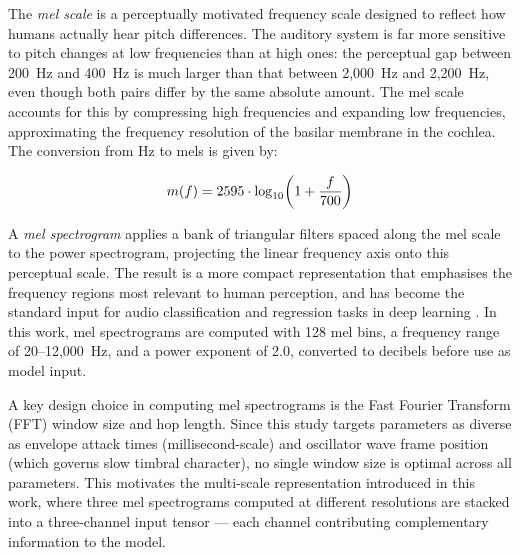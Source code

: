 \par \vspace{0.3cm}

\noindent The \textit{mel scale} is a perceptually motivated frequency scale designed to reflect how humans actually hear pitch differences. The auditory system is far more sensitive to pitch changes at low frequencies than at high ones: the perceptual gap between 200~Hz and 400~Hz is much larger than that between 2{,}000~Hz and 2{,}200~Hz, even though both pairs differ by the same absolute amount. The mel scale accounts for this by compressing high frequencies and expanding low frequencies, approximating the frequency resolution of the basilar membrane in the cochlea. The conversion from Hz to mels is given by:

\begin{equation}
  m(f) = 2595 \cdot \log_{10}\!\left(1 + \frac{f}{700}\right)
  \label{eq:mel_bg}\eqname{Hertz to mel scale conversion}
\end{equation}

\par \vspace{0.3cm}

\noindent A \textit{mel spectrogram} applies a bank of triangular filters spaced along the mel scale to the power spectrogram, projecting the linear frequency axis onto this perceptual scale. The result is a more compact representation that emphasises the frequency regions most relevant to human perception, and has become the standard input for audio classification and regression tasks in deep learning \cite{hershey2017cnn}. In this work, mel spectrograms are computed with 128 mel bins, a frequency range of 20--12{,}000~Hz, and a power exponent of 2.0, converted to decibels before use as model input.

\par \vspace{0.3cm}

\noindent A key design choice in computing mel spectrograms is the Fast Fourier Transform (FFT) window size and hop length. Since this study targets parameters as diverse as envelope attack times (millisecond-scale) and oscillator wave frame position (which governs slow timbral character), no single window size is optimal across all parameters. This motivates the multi-scale representation introduced in this work, where three mel spectrograms computed at different resolutions are stacked into a three-channel input tensor --- each channel contributing complementary information to the model.


